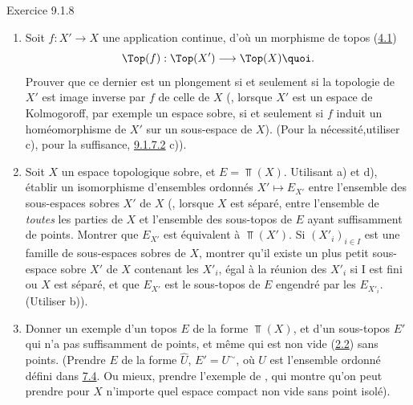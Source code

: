 \documentclass[10pt]{../fichiers-configuration-latex/smfart}
\begin{document}
\begin{enonce*}[remark]{Exercice 9.1.8}
\begin{enumerate}
\item Soit $f:X'\rightarrow X$ une application continue, d'où un
morphisme de topos (\hyperref[IV.subsec4.1]{4.1})
$$
\Top(f):\Top(X')\longrightarrow \Top(X){\quoi}.
$$
Prouver que ce dernier est un plongement si et seulement si la
topologie de $X'$ est image inverse par $f$ de celle de $X$ (\ie,
lorsque $X'$ est un espace de Kolmogoroff, par exemple un espace
sobre, si et seulement si $f$ induit un homéomorphisme de $X'$ sur
un sous-espace de $X$). (Pour la nécessité,\pageoriginale utiliser
c), pour la suffisance, \hyperref[IV.exer9.1.7.2]{9.1.7.2} c)).

\item Soit $X$ un espace topologique sobre, et $E=\Top(X)$. Utilisant
a) et d), établir un isomorphisme d'ensembles ordonnés $X'\mapsto
E_{X'}$ entre l'ensemble des sous-espaces sobres $X'$ de $X$ (\ie,
lorsque $X$ est séparé, entre l'ensemble de \emph{toutes} les
parties de $X$ et l'ensemble des sous-topos de $E$ ayant
suffisamment de points. Montrer que $E_{X'}$ est équivalent à
$\Top(X')$. Si $(X'_i)_{i\in I}$ est une famille de sous-espaces
sobres de $X$, montrer qu'il existe un plus petit sous-espace sobre
$X'$ de $X$ contenant les $X'_i$, égal à la réunion des $X'_i$ si I
est fini ou $X$ est séparé, et que $E_{X'}$ est le sous-topos de $E$
engendré par les $E_{X'_i}$. (Utiliser b)).

\item Donner un exemple d'un topos $E$ de la forme $\Top(X)$, et d'un
sous-topos $E'$ qui n'a pas suffisamment de points, et même qui est
non vide (\hyperref[IV.subsec2.2]{2.2}) sans points. (Prendre $E$ de la forme
$\widehat{U}$, $E'=U^{\sim}$, où $U$ est l'ensemble ordonné défini
dans \hyperref[IV.subsec7.4]{7.4}. Ou mieux, prendre l'exemple de ,
qui montre qu'on peut prendre pour $X$ n'importe quel espace compact
non vide sans point isolé).
\end{enumerate}
\end{enonce*}
\end{document}
